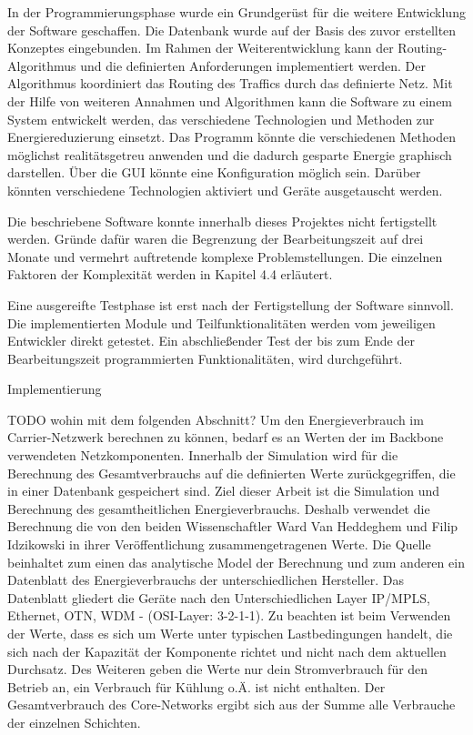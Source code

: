 \documentclass[12pt,titlepage]{article}
\begin{document}
In der Programmierungsphase wurde ein Grundgerüst für die weitere Entwicklung der Software geschaffen. Die Datenbank wurde auf der Basis des zuvor erstellten Konzeptes eingebunden. Im Rahmen der Weiterentwicklung kann der Routing-Algorithmus und die definierten Anforderungen implementiert werden. Der Algorithmus koordiniert das Routing des Traffics durch das definierte Netz. Mit der Hilfe von weiteren Annahmen und Algorithmen kann die Software zu einem System entwickelt werden, das verschiedene Technologien und Methoden zur Energiereduzierung einsetzt. Das Programm könnte die verschiedenen Methoden möglichst realitätsgetreu anwenden und die dadurch gesparte Energie graphisch darstellen. Über die GUI könnte eine Konfiguration möglich sein.  Darüber könnten verschiedene Technologien aktiviert und Geräte ausgetauscht werden. 


Die beschriebene Software konnte innerhalb dieses Projektes nicht fertigstellt werden. Gründe dafür waren die Begrenzung der Bearbeitungszeit auf drei Monate und vermehrt auftretende komplexe Problemstellungen. Die einzelnen Faktoren der Komplexität werden in Kapitel 4.4 erläutert.


Eine ausgereifte Testphase ist erst nach der Fertigstellung der Software sinnvoll. Die implementierten Module und Teilfunktionalitäten werden vom jeweiligen Entwickler direkt getestet. Ein abschließender Test der bis zum Ende der Bearbeitungszeit programmierten Funktionalitäten, wird durchgeführt.


Implementierung

TODO wohin mit dem folgenden Abschnitt?
Um den Energieverbrauch im Carrier-Netzwerk berechnen zu können, bedarf es an Werten der im Backbone verwendeten Netzkomponenten. Innerhalb der Simulation wird für die Berechnung des Gesamtverbrauchs auf die definierten Werte zurückgegriffen, die in einer Datenbank gespeichert sind. Ziel dieser Arbeit ist die Simulation und Berechnung des gesamtheitlichen Energieverbrauchs. Deshalb verwendet die Berechnung die von den beiden Wissenschaftler Ward Van Heddeghem und Filip Idzikowski in ihrer Veröffentlichung \cite{vanhedde} zusammengetragenen Werte. Die Quelle beinhaltet zum einen das analytische Model der Berechnung und zum anderen ein Datenblatt \cite{vanhsheet} des Energieverbrauchs der unterschiedlichen Hersteller. Das Datenblatt gliedert die Geräte nach den Unterschiedlichen Layer IP/MPLS, Ethernet, OTN, WDM - (OSI-Layer: 3-2-1-1). Zu beachten ist beim Verwenden der Werte, dass es sich um Werte unter typischen Lastbedingungen handelt, die sich nach der Kapazität der Komponente richtet und nicht nach dem aktuellen Durchsatz. Des Weiteren geben die Werte nur dein Stromverbrauch für den Betrieb an, ein Verbrauch für Kühlung o.Ä. ist nicht enthalten.
Der Gesamtverbrauch des Core-Networks ergibt sich aus der Summe alle Verbrauche der einzelnen Schichten.
\end{document}
